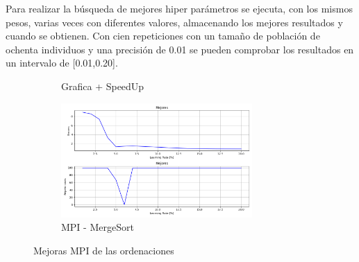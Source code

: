			Para realizar la búsqueda de mejores hiper parámetros se ejecuta, con los mismos pesos, varias veces con diferentes valores, almacenando los mejores resultados y cuando se obtienen. Con cien repeticiones con un tamaño de población de ochenta individuos y una precisión de 0.01 se pueden comprobar los resultados en un intervalo de [0.01,0.20].


			\begin{figure}[!h]
				\centering
				
				
				\begin{subfigure}[t]{0.35\textwidth}
					\label{fig:redneubusqueda}
					\caption{Grafica + SpeedUp}
				\end{subfigure}
				\hfill
				\begin{subfigure}[t]{0.55\textwidth}
					\centering
					\includegraphics[width=0.8\textwidth,height=0.8\textwidth]{images/chapter_4/redneu_err}
					
					\caption{MPI - MergeSort}
					\label{fig:Errores}
				\end{subfigure}
				
				\caption{Mejoras MPI de las ordenaciones}
				\label{fig:Red Neuronal - Busqueda}
			\end{figure}




